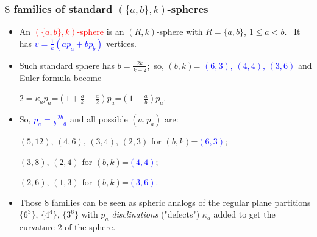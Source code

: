 \documentclass{beamer}
\begin{document}
\begin{frame}\frametitle{$8$ families of standard $(\{a,b\},k)$-spheres}



\begin{itemize}

\item An \textcolor{red}{$(\{a,b\},k)$-sphere} is an  $(R,k)$-sphere
with $R=\{a,b\}$, $1\le a < b$. $\,$ 
It has  \textcolor{blue}{$v$$=$$\frac{1}{k}(ap_a+bp_b)$} vertices.
\item 
Such standard sphere has $b=\frac{2k}{k-2}$;$\,$
 so, $(b,k)$=
\textcolor{blue}{$(6,3),\,(4,4),\,(3,6)$} 
and
Euler formula become

$2=\kappa_ap_a$=$(1+\frac{a}{k}-\frac{a}{2})p_a$=$(1-\frac{a}{b})p_a$.

 
 



\item So, \textcolor{blue}{$p_a=\frac{2b}{b-a}$}
and all possible
$(a,p_a)$ are:

 $(5,12),\, (4,6),\, (3,4),\, (2,3)$ for 
$(b,k)$=\textcolor{blue}{$(6,3)$};
         
$(3,8),\, (2,4)$ for $(b,k)$=\textcolor{blue}{$(4,4)$}; $\,\,$

$(2,6),\, (1,3)$ for $(b,k)$=\textcolor{blue}{$(3,6)$}.

\item Those $8$ families can be seen  as spheric analogs of the 
regular plane partitions $\{6^3\},\,\{4^4\},\,\{3^6\}$ with $p_a$ 
{\em disclinations} ("defects") $\kappa_a$   added to get the 
curvature $2$
of the sphere.


 \end{itemize}\end{frame}
\end{document}
